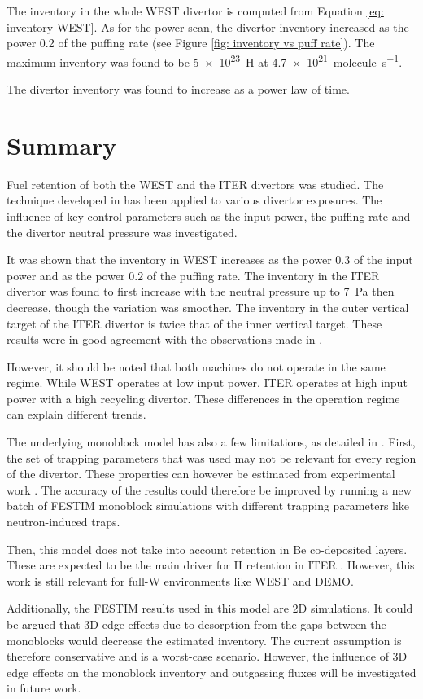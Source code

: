 The inventory in the whole WEST divertor is computed from Equation \eqref{eq: inventory WEST}.
As for the power scan, the divertor inventory increased as the power 0.2 of the puffing rate (see Figure \ref{fig: inventory vs puff rate}).
The maximum inventory was found to be \SI{5e23}{H} at \SI{4.7e21}{molecule.s^{-1}}.

The divertor inventory was found to increase as a power law of time.

\section{Summary}

Fuel retention of both the WEST and the ITER divertors was studied.
The technique developed in  has been applied to various divertor exposures.
The influence of key control parameters such as the input power, the puffing rate and the divertor neutral pressure was investigated.

It was shown that the inventory in WEST increases as the power $0.3$ of the input power and as the power $0.2$ of the puffing rate.
The inventory in the ITER divertor was found to first increase with the neutral pressure up to \SI{7}{Pa} then decrease, though the variation was smoother.
The inventory in the outer vertical target of the ITER divertor is twice that of the inner vertical target.
These results were in good agreement with the observations made in .

However, it should be noted that both machines do not operate in the same regime.
While WEST operates at low input power, ITER operates at high input power with a high recycling divertor.
These differences in the operation regime can explain different trends.

The underlying monoblock model has also a few limitations, as detailed in .
First, the set of trapping parameters that was used may not be relevant for every region of the divertor.
These properties can however be estimated from experimental work .
The accuracy of the results could therefore be improved by running a new batch of FESTIM monoblock simulations with different trapping parameters like neutron-induced traps.

Then, this model does not take into account retention in Be co-deposited layers.
These are expected to be the main driver for H retention in ITER .
However, this work is still relevant for full-W environments like WEST and DEMO.

Additionally, the FESTIM results used in this model are 2D simulations.
It could be argued that 3D edge effects due to desorption from the gaps between the monoblocks would decrease the estimated inventory.
The current assumption is therefore conservative and is a worst-case scenario.
However, the influence of 3D edge effects on the monoblock inventory and outgassing fluxes will be investigated in future work.

